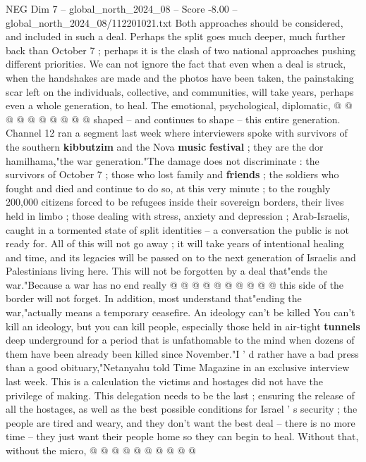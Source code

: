 \begin{textsample}{NEG Dim 7 – global\_north\_2024\_08 – Score -8.00 – global\_north\_2024\_08/112201021.txt}
Both approaches should be considered, and included in such a deal.
Perhaps the split goes much deeper, much further back than October 7 ; perhaps it is the clash of two national approaches pushing different priorities.
We can not ignore the fact that even when a deal is struck, when the handshakes are made and the photos have been taken, the painstaking scar left on the individuals, collective, and communities, will take years, perhaps even a whole generation, to heal.
The emotional, psychological, diplomatic, @ @ @ @ @ @ @ @ @ @ shaped -- and continues to shape -- this entire generation.
Channel 12 ran a segment last week where interviewers spoke with survivors of the southern \textbf{kibbutzim} and the Nova \textbf{music} \textbf{festival} ; they are the dor hamilhama,"the war generation."The damage does not discriminate : the survivors of October 7 ; those who lost family and \textbf{friends} ; the soldiers who fought and died and continue to do so, at this very minute ; to the roughly 200,000 citizens forced to be refugees inside their sovereign borders, their lives held in limbo ; those dealing with stress, anxiety and depression ; Arab-Israelis, caught in a tormented state of split identities -- a conversation the public is not ready for.
All of this will not go away ; it will take years of intentional healing and time, and its legacies will be passed on to the next generation of Israelis and Palestinians living here.
This will not be forgotten by a deal that"ends the war."Because a war has no end really @ @ @ @ @ @ @ @ @ @ this side of the border will not forget.
In addition, most understand that"ending the war,"actually means a temporary ceasefire.
An ideology can't be killed You can't kill an ideology, but you can kill people, especially those held in air-tight \textbf{tunnels} deep underground for a period that is unfathomable to the mind when dozens of them have been already been killed since November."I ' d rather have a bad press than a good obituary,"Netanyahu told Time Magazine in an exclusive interview last week.
This is a calculation the victims and hostages did not have the privilege of making.
This delegation needs to be the last ; ensuring the release of all the hostages, as well as the best possible conditions for Israel ' s security ; the people are tired and weary, and they don't want the best deal -- there is no more time -- they just want their people home so they can begin to heal.
Without that, without the micro, @ @ @ @ @ @ @ @ @ @

\end{textsample}
